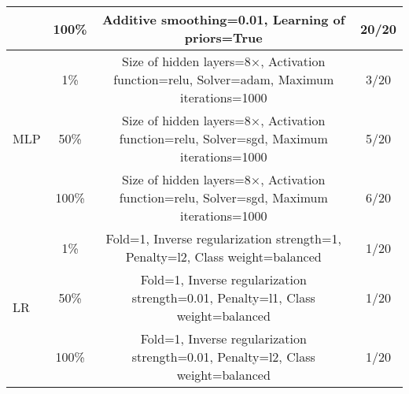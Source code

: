 \begin{sidewaystable}[!tb]
{\begin{tabular}{lccc}
 & 100\% & Additive smoothing=0.01, Learning of priors=True & 20/20 \\
\midrule
\multirow{3}{*}{MLP} & 1\% & Size of hidden layers=8×, Activation function=relu, Solver=adam, Maximum iterations=1000 & 3/20 \\
 & 50\% & Size of hidden layers=8×, Activation function=relu, Solver=sgd, Maximum iterations=1000 & 5/20 \\
 & 100\% & Size of hidden layers=8×, Activation function=relu, Solver=sgd, Maximum iterations=1000 & 6/20 \\
\midrule
\multirow{3}{*}{LR} & 1\% & Fold=1, Inverse regularization strength=1, Penalty=l2, Class weight=balanced & 1/20 \\
 & 50\% & Fold=1, Inverse regularization strength=0.01, Penalty=l1, Class weight=balanced & 1/20 \\
 & 100\% & Fold=1, Inverse regularization strength=0.01, Penalty=l2, Class weight=balanced & 1/20 \\
\midrule
\bottomrule
\end{tabular}}
\label{tab:hyperparameter_frequency}
\end{sidewaystable}